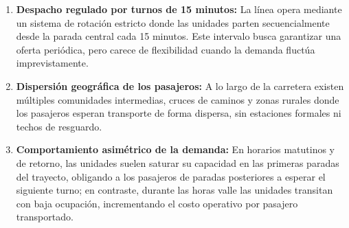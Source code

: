 \begin{enumerate}[label=\alph*)]
    \item \textbf{Despacho regulado por turnos de 15 minutos:} La línea opera mediante un sistema de rotación estricto donde las unidades parten secuencialmente desde la parada central cada 15 minutos. Este intervalo busca garantizar una oferta periódica, pero carece de flexibilidad cuando la demanda fluctúa imprevistamente.
    \item \textbf{Dispersión geográfica de los pasajeros:} A lo largo de la carretera existen múltiples comunidades intermedias, cruces de caminos y zonas rurales donde los pasajeros esperan transporte de forma dispersa, sin estaciones formales ni techos de resguardo.
    \item \textbf{Comportamiento asimétrico de la demanda:} En horarios matutinos y de retorno, las unidades suelen saturar su capacidad en las primeras paradas del trayecto, obligando a los pasajeros de paradas posteriores a esperar el siguiente turno; en contraste, durante las horas valle las unidades transitan con baja ocupación, incrementando el costo operativo por pasajero transportado.
\end{enumerate}

